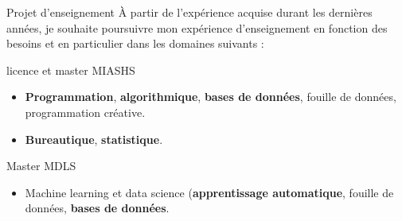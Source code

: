 
%
%


\begin{frame}{Projet d'enseignement}
À partir de l'expérience acquise durant les dernières années, je souhaite poursuivre mon expérience d’enseignement en fonction des besoins et en particulier dans les domaines  suivants :
\begin{block}{licence et master MIASHS}
\begin{itemize}
\item \textbf{Programmation}, \textbf{algorithmique}, \textbf{bases de données}, fouille de données, programmation créative.
\item \textbf{Bureautique}, \textbf{statistique}.  
\end{itemize}
\end{block}
	
\begin{block}{Master MDLS}
\begin{itemize}
\item Machine learning et data science (\textbf{apprentissage automatique}, fouille de données, \textbf{bases de données}.
\end{itemize}
\end{block}


\end{frame}

